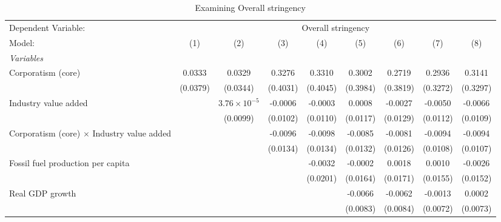 
\begin{table}[htbp]
   \caption{Examining Overall stringency}
   \centering
   \begin{tabular}{lcccccccc}
      \tabularnewline \midrule \midrule
      Dependent Variable: & \multicolumn{8}{c}{Overall stringency}\\
      Model:                                            & (1)      & (2)                   & (3)      & (4)      & (5)      & (6)      & (7)      & (8)\\  
      \midrule
      \emph{Variables}\\
      Corporatism (core)                                & 0.0333   & 0.0329                & 0.3276   & 0.3310   & 0.3002   & 0.2719   & 0.2936   & 0.3141\\   
                                                        & (0.0379) & (0.0344)              & (0.4031) & (0.4045) & (0.3984) & (0.3819) & (0.3272) & (0.3297)\\   
      Industry value added                              &          & $3.76\times 10^{-5}$  & -0.0006  & -0.0003  & 0.0008   & -0.0027  & -0.0050  & -0.0066\\   
                                                        &          & (0.0099)              & (0.0102) & (0.0110) & (0.0117) & (0.0129) & (0.0112) & (0.0109)\\   
      Corporatism (core) $\times$ Industry value added  &          &                       & -0.0096  & -0.0098  & -0.0085  & -0.0081  & -0.0094  & -0.0094\\   
                                                        &          &                       & (0.0134) & (0.0134) & (0.0132) & (0.0126) & (0.0108) & (0.0107)\\   
      Fossil fuel production per capita                 &          &                       &          & -0.0032  & -0.0002  & 0.0018   & 0.0010   & -0.0026\\   
                                                        &          &                       &          & (0.0201) & (0.0164) & (0.0171) & (0.0155) & (0.0152)\\   
      Real GDP growth                                   &          &                       &          &          & -0.0066  & -0.0062  & -0.0013  & 0.0002\\   
                                                        &          &                       &          &          & (0.0083) & (0.0084) & (0.0072) & (0.0073)\\   

\end{tabular}
\end{table}
